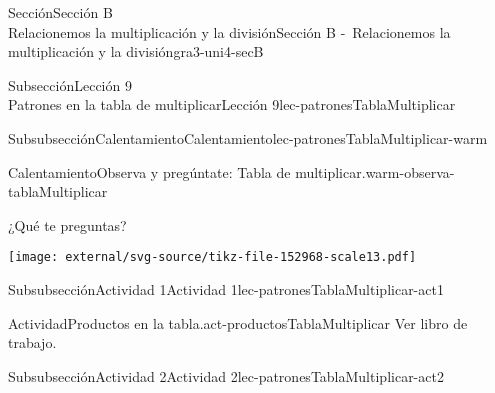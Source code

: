 \begin{sectionptx}{Sección}{{\Large Sección B\\}Relacionemos la multiplicación y la división}{}{Sección B -~Relacionemos la multiplicación y la división}{}{}{gra3-uni4-secB}
\begin{subsectionptx}{Subsección}{{\normalsize Lección 9\\[-0.05cm]}Patrones en la tabla de multiplicar}{}{Lección 9}{}{}{lec-patronesTablaMultiplicar}
\begin{subsubsectionptx}{Subsubsección}{Calentamiento}{}{Calentamiento}{}{}{lec-patronesTablaMultiplicar-warm}
\begin{exploration}{Calentamiento}{Observa y pregúntate: Tabla de multiplicar.}{warm-observa-tablaMultiplicar}
\begin{sidebyside}{2}{0}{0}{0.05}
\begin{sbspanel}{0.3}
 ¿Qué te preguntas?%
\end{sbspanel}%
\begin{sbspanel}{0.7}%
\begin{image}{0}{1}{0}{}%
\texttt{[image: external/svg-source/tikz-file-152968-scale13.pdf]}
\end{image}%
\end{sbspanel}%
\end{sidebyside}%
\end{exploration}%
\end{subsubsectionptx}
%
%
\typeout{************************************************}
\typeout{************************************************}
%
\begin{subsubsectionptx}{Subsubsección}{Actividad 1}{}{Actividad 1}{}{}{lec-patronesTablaMultiplicar-act1}
\begin{activity}{Actividad}{Productos en la tabla.}{act-productosTablaMultiplicar}%
Ver libro de trabajo.
\end{activity}%
\end{subsubsectionptx}
%
%
\typeout{************************************************}
\typeout{************************************************}
%
\begin{subsubsectionptx}{Subsubsección}{Actividad 2}{}{Actividad 2}{}{}{lec-patronesTablaMultiplicar-act2}

\end{subsubsectionptx}
\end{subsectionptx}
\end{sectionptx}
